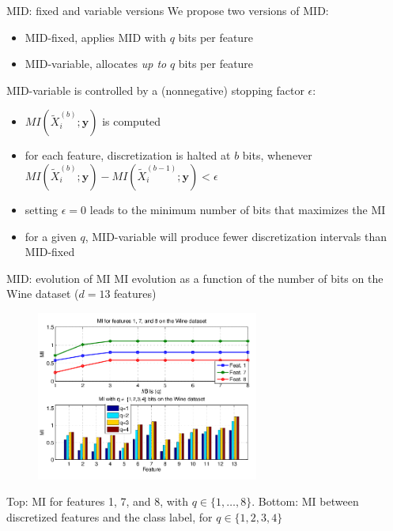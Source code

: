 \documentclass{beamer}
\begin{document}
\begin{frame}{MID: fixed and variable versions}
We propose two versions of MID:
\begin{itemize}
	\item MID-fixed, applies MID with $q$ bits per feature
	\item MID-variable, allocates \emph{up to} $q$ bits per feature
\end{itemize}

\vfill
MID-variable is controlled by a
(nonnegative) stopping factor $\epsilon$:
\begin{itemize}
	\vfill
	\item $MI(\widetilde{X}_i^{(b)};\mathbf{y})$ is computed
		
	\vfill
	\item for each feature, discretization is halted at $b$ bits, whenever
	$MI(\widetilde{X}_i^{(b)};\mathbf{y}) - MI(\widetilde{X}_i^{(b-1)};\mathbf{y}) < \epsilon$
	
	\vfill
	\item setting $\epsilon=0$ leads to the minimum number of bits that maximizes the MI
	
	\vfill
	\item for a given $q$, MID-variable will produce
fewer discretization intervals than MID-fixed
\end{itemize}
\end{frame}


\begin{frame}{MID: evolution of MI}
MI evolution as a function of the number of bits on the Wine dataset ($d=13$ features)
\begin{figure}
	\centering
	\includegraphics[width=0.65\textwidth]{fig3.png}
\end{figure}
{\small Top: MI for features 1, 7, and 8, with $q \in \{1,\ldots,8\}$.
  Bottom: MI between discretized features and the class label, for $q \in \{1,2,3,4\}$}
\end{frame}
\end{document}

